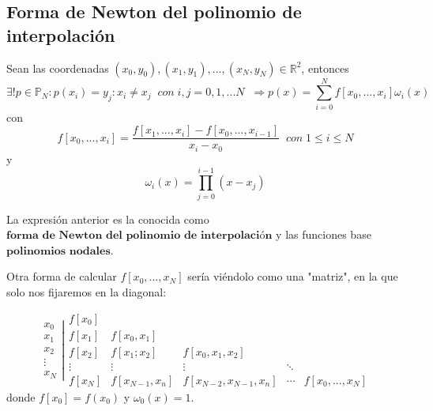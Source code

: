 \subsection{Forma de Newton del polinomio de interpolación}
\begin{nth}
Sean las coordenadas $(x_0,y_0), (x_1,y_1),...,(x_N,y_N) \in \mathbb{R}^2$, entonces
\[ \exists ! p \in \mathbb{P} _N : p(x_i) = y_j : x_i \neq x_j \; \; con \; i,j = 0,1,...N \; \; \Rightarrow p(x) = \sum_{i=0}^N f \left[ x_0,...,x_i \right] \omega _i(x) \]
con
\[ f \left[ x_0,...,x_i \right] = \frac{f \left[ x_1,...,x_i \right] - f \left[ x_0,...,x_{i-1} \right] }{x_i - x_0} \; \; con \; 1 \leq i \leq N\] 
y
\[ \omega _i(x) = \prod _{j=0}^{i-1} (x-x_j) \]
\end{nth}
La expresión anterior es la conocida como $\textbf{forma de Newton del polinomio de
interpolación}$ y las funciones base $\textbf{polinomios nodales}$.

Otra forma de calcular $f \left[ x_0,...,x_N \right]$ sería viéndolo como una "matriz", en la que solo nos fijaremos en la diagonal:

\[
\left. \begin{array}{c}
x_0 \\
x_1 \\
x_2 \\
\vdots \\
x_N
\end{array} \right| 
\begin{array}{ccccc}
f \left[ x_0 \right] & & & & \\
f \left[ x_1 \right] & f \left[ x_0,x_1 \right] & & & \\
f \left[ x_2 \right] & f \left[ x_1;x_2 \right] & f \left[ x_0,x_1,x_2 \right] & & \\
\vdots & \vdots & \vdots & \ddots & \\
f \left[ x_N \right] & f \left[ x_{N-1},x_n \right] & f \left[ x_{N-2},x_{N-1},x_n \right] & \cdots & f \left[ x_0,...,x_N \right] 
\end{array}
\]
donde $f \left[ x_0 \right] = f(x_0)$ y $\omega _0(x) = 1$.

